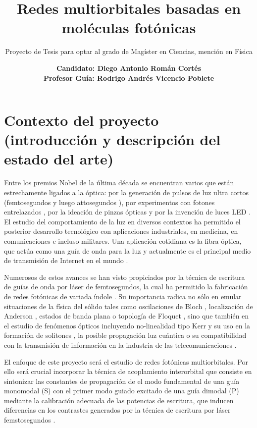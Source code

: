 \documentclass{article}
\date{\textbf{Candidato: Diego Antonio Román Cortés\\ Profesor Guía: Rodrigo Andrés Vicencio Poblete}}
\author{Proyecto de Tesis para optar al grado de Magíster en Ciencias, mención en Física}
\title{Redes multiorbitales basadas en moléculas fotónicas}
\begin{document}
 \maketitle

\section{Contexto del proyecto (introducción y descripción del estado del arte)}

Entre los premios Nobel de la última década \cite{nobel} se encuentran varios que están estrechamente ligados a la óptica: por la generación de pulsos de luz ultra cortos (femtosegundos \cite{femto1} y luego attosegundos \cite{atto1, atto2, atto3}), por experimentos con fotones entrelazados \cite{photons1, photons2, photons3}, por la ideación de pinzas ópticas \cite{opticaltweezers} y por la invención de luces LED \cite{led1, led2, led3}. El estudio del comportamiento de la luz en diversos contextos ha permitido el posterior desarrollo tecnológico con aplicaciones industriales, en medicina, en comunicaciones e incluso militares. Una aplicación cotidiana es la fibra óptica, que actúa como una guía de onda para la luz y actualmente es el principal medio de transmisión de Internet en el mundo \cite{fibra2, fibra}. 
	
	Numerosos de estos avances se han visto propiciados por la técnica de escritura de guías de onda por láser de femtosegundos, la cual ha permitido la fabricación de redes fotónicas de variada índole \cite{femto, bics, lieb1, lieb2, artificialFB, FBdynamics, strain, dendritas, splitters}. Su importancia radica no sólo en emular situaciones de la física del sólido tales como oscilaciones de Bloch \cite{BlochOsci}, localización de Anderson \cite{Anderson}, estados de banda plana \cite{lieb1, lieb2, artificialFB, FBdynamics} o topología de Floquet \cite{obstopo, obsfloquet}, sino que también en el estudio de fenómenos ópticos incluyendo no-linealidad tipo Kerr y su uso en la formación de solitones \cite{discretesolitons}, la posible propagación luz cuántica \cite{qed, squeezed, topoquantum} o su compatibilidad con la transmisión de información en la industria de las telecomunicaciones \cite{telecom}.
	
	El enfoque de este proyecto será el estudio de redes fotónicas multiorbitales. Por ello será crucial incorporar la técnica de acoplamiento interorbital que consiste en sintonizar las constantes de propagación de el modo fundamental de una guía monomodal (S) con el primer modo guiado excitado de una guía dimodal (P) mediante la calibración adecuada de las potencias de escritura, que inducen diferencias en los contrastes generados por la técnica de escritura por láser femstosegundos \cite{interorbital}.
	
\end{document}
